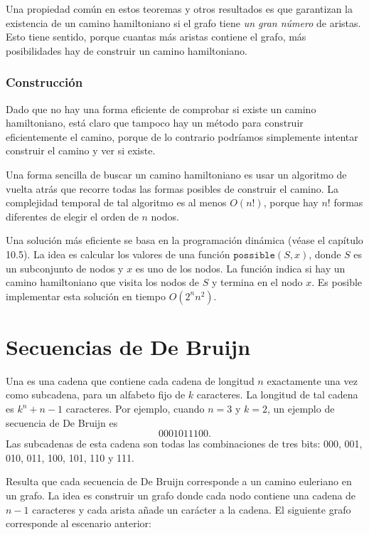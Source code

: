 Una propiedad común en estos teoremas y otros resultados es
que garantizan la existencia de un camino hamiltoniano
si el grafo tiene \emph{un gran número} de aristas.
Esto tiene sentido, porque cuantas más aristas contiene el grafo,
más posibilidades hay de construir un camino hamiltoniano.

\subsubsection{Construcción}

Dado que no hay una forma eficiente de comprobar si existe un camino
hamiltoniano, está claro que tampoco hay un método
para construir eficientemente el camino, porque de lo contrario
podríamos simplemente intentar construir el camino y ver
si existe.

Una forma sencilla de buscar un camino hamiltoniano es
usar un algoritmo de vuelta atrás que recorre todas
las formas posibles de construir el camino.
La complejidad temporal de tal algoritmo es al menos $O(n!)$,
porque hay $n!$ formas diferentes de elegir el orden de $n$ nodos.

Una solución más eficiente se basa en la programación dinámica
(véase el capítulo 10.5).
La idea es calcular los valores
de una función $\texttt{possible}(S,x)$,
donde $S$ es un subconjunto de nodos y $x$
es uno de los nodos.
La función indica si hay un camino hamiltoniano
que visita los nodos de $S$ y termina en el nodo $x$.
Es posible implementar esta solución en tiempo $O(2^n n^2)$.

\section{Secuencias de De Bruijn}


Una 
es una cadena que contiene
cada cadena de longitud $n$
exactamente una vez como subcadena, para un alfabeto
fijo de $k$ caracteres.
La longitud de tal cadena es
$k^n+n-1$ caracteres.
Por ejemplo, cuando $n=3$ y $k=2$,
un ejemplo de secuencia de De Bruijn es
\[0001011100.\]
Las subcadenas de esta cadena son todas
las combinaciones de tres bits:
000, 001, 010, 011, 100, 101, 110 y 111.

Resulta que cada secuencia de De Bruijn
corresponde a un camino euleriano en un grafo.
La idea es construir un grafo donde
cada nodo contiene una cadena de $n-1$ caracteres
y cada arista añade un carácter a la cadena.
El siguiente grafo corresponde al escenario anterior:

